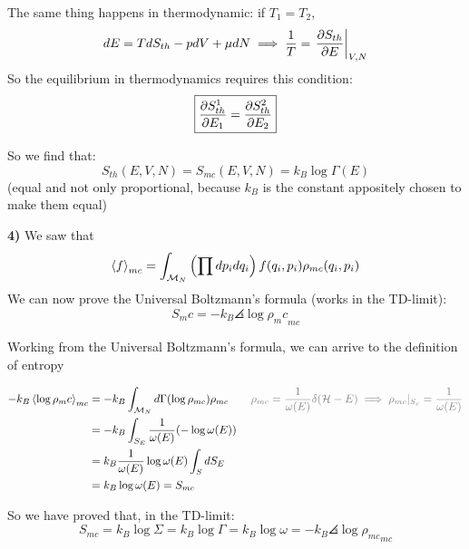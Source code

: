 The same thing happens in thermodynamic: if $T_1=T_2$, 
$$dE = TdS_{th} - pdV+ \mu dN \implies \frac 1T = \left.\frac{\partial S_{th}}{\partial E}\right|_{V,N}$$
So the equilibrium in thermodynamics requires this condition:
$$\boxed{\frac{\partial S_{th}^1}{\partial E_1} = \frac{\partial S_{th}^2}{\partial E_2}}$$

So we find that: 
$$ S_{th}(E,V,N) = S_{mc}(E,V,N) = k_B\log\Gamma(E)$$
(equal and not only proportional, because $k_B$ is the constant appositely chosen to make them equal)

\EndPf

\textbf{4)} We saw that 
$$\left<f\right>_{mc} = \int_ {\mathcal{M}_N}\left(\prod dp_i dq_i\right) f(q_i,p_i) \rho_{mc}(q_i,p_i) $$
We can now prove the Universal Boltzmann's formula (works in the TD-limit):
$$ S_mc = -k_B \angles{\log\rho_mc}_{mc}$$

\Pf Working from the Universal Boltzmann's formula, we can arrive to the definition of entropy

\begin{align*}
    -k_B \angles{\log\rho_mc}_{mc} &= -k_B\int_{\ps_N} d\Gamma(\log\rho_{mc})\rho_{mc} \qquad \gray{\rho_{mc} = \frac 1{\omega(E)} \delta(\ham-E) \implies \rho_{mc}|_{S_c} = \frac 1{\omega(E)}} \\
    &= -k_B\int_{S_E} \frac 1{\omega(E)}(-\log \omega(E)) \\
    &= k_B \frac 1{\omega(E)} \log \omega(E) \int_S dS_E \\
    &= k_B \log \omega (E) = S_{mc}
\end{align*}

So we have proved that, in the TD-limit:
$$ S_{mc} = k_B \log \Sigma = k_B\log\Gamma = k_B\log \omega = -k_B\angles{\log\rho_{mc}}_{mc}$$

